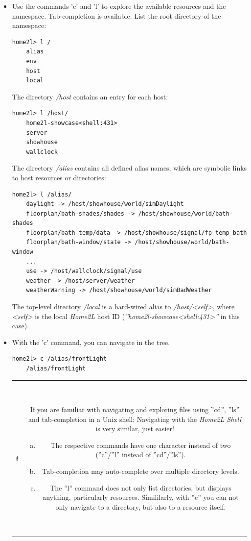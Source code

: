 \documentclass[12pt,english,parskip=half,headheight=19pt]{scrreprt}
\newcommand{\infobox}[1]{
  \par
  \medskip
  \hfill
  \setlength\arrayrulewidth{1pt}
  \begin{tabular}[t]{c|c|}
    \parbox{1.8em}{\hfill\textit{\Huge\textbf{i}\,}}
    &
    \,\parbox{0.89\linewidth}{\setlength{\parskip}{0.5em} \small #1}\,
  \end{tabular}
  \medskip
  \par
}
\begin{document}
\begin{itemize}[$\blacktriangleright$]

\item
  Use the commands 'c' and 'l' to explore the available resources and the namespace.
  Tab-completion is available.
  List the root directory of the namespace:
  \begin{lstlisting}[language=home2l]
    home2l> l /
    alias
    env
    host
    local
  \end{lstlisting}

  The directory \textit{/host} contains an entry for each host:
  \begin{lstlisting}[language=home2l]
    home2l> l /host/
    home2l-showcase<shell:431>
    server
    showhouse
    wallclock
  \end{lstlisting}

  The directory \textit{/alias} contains all defined alias names, which are symbolic
  links to host resources or directories:
  \begin{lstlisting}[language=home2l]
    home2l> l /alias/
    daylight -> /host/showhouse/world/simDaylight
    floorplan/bath-shades/shades -> /host/showhouse/world/bath-shades
    floorplan/bath-temp/data -> /host/showhouse/signal/fp_temp_bath
    floorplan/bath-window/state -> /host/showhouse/world/bath-window
    ...
    use -> /host/wallclock/signal/use
    weather -> /host/server/weather
    weatherWarning -> /host/showhouse/world/simBadWeather
  \end{lstlisting}

  The top-level directory \textit{/local} is a hard-wired alias to
  \textit{/host/<self>}, where \textit{<self>} is the local
  \textit{Home2L} host ID (\textit{''home2l-showcase<shell:431>''} in this case).

\item
  With the 'c' command, you can navigate in the tree.
  \begin{lstlisting}[language=home2l]
    home2l> c /alias/frontLight
    /alias/frontLight
  \end{lstlisting}

  \infobox{
    If you are familiar with navigating and exploring files using ''cd'', ''ls'' and
    tab-completion in a Unix shell: Navigating with the \textit{Home2L Shell} is very
    similar, just easier!
    \begin{enumerate}[a)]
      \item The respective commands have one character instead of two (''c''/''l'' instead of ''cd''/''ls'').
      \item Tab-completion may auto-complete over multiple directory levels.
      \item The ''l'' command does not only list directories, but displays anything, particularly resources.
        Simililarly, with ''c'' you can not only navigate to a directory, but also to a resource itself.
    \end{enumerate}
  }


\end{itemize}
\end{document}
